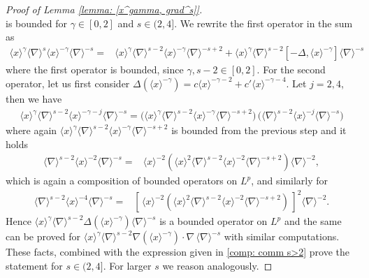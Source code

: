 \documentclass[12pt]{article}
\theoremstyle{plain}
\begin{document}
\begin{proof}[Proof of Lemma \ref{lemma: [x^gamma, grad^s]}]
\begin{equation*}
     \end{equation*}
     is bounded for $\gamma \in [0,2]$ and $s \in (2, 4]$. We rewrite the first operator in the sum as 
     \begin{align}
     \label{comp: comm s>2}
         \langle x \rangle^\gamma \langle \nabla \rangle^s \langle x \rangle^{-\gamma }\langle \nabla \rangle^{-s} =& \langle x \rangle^\gamma \langle \nabla \rangle^{s-2} \langle x \rangle^{-\gamma }\langle \nabla \rangle^{-s+2} + \langle x \rangle^\gamma \langle \nabla \rangle^{s-2} [-\Delta , \langle x \rangle^{-\gamma}]\langle \nabla \rangle^{-s}
     \end{align}
     where the first operator is bounded, since $\gamma, s-2 \in [0,2]$. For the second operator, let us first consider $ \Delta (\langle x \rangle^{-\gamma}) = c \langle x \rangle^{-\gamma-2} + c' \langle x \rangle^{-\gamma-4} $. Let $ j =2,4$, then we have
     \begin{align*}
          \langle x \rangle^\gamma \langle \nabla \rangle^{s-2} \langle x \rangle^{-\gamma-j} \langle \nabla \rangle^{-s} = \big(\langle x \rangle^\gamma \langle \nabla \rangle^{s-2} \langle x \rangle^{-\gamma}\langle \nabla \rangle^{-s +2}\big)\,\big( \langle \nabla \rangle^{s -2} \langle x \rangle^{-j}  \langle \nabla \rangle^{-s} \big)
     \end{align*}
     where again $\langle x \rangle^\gamma \langle \nabla \rangle^{s-2} \langle x \rangle^{-\gamma}\langle \nabla \rangle^{-s +2}$ is bounded from the previous step and it holds 
     \begin{align*}
         \langle \nabla \rangle^{s -2} \langle x \rangle^{-2}  \langle \nabla \rangle^{-s}  = &  \langle x \rangle^{-2}(\langle x \rangle^{2}\langle \nabla \rangle^{s -2} \langle x \rangle^{-2}  \langle \nabla \rangle^{-s+2}) \langle \nabla \rangle^{-2} ,
     \end{align*}
     which is again a composition of bounded operators on $L^p$, and similarly for 
     \begin{align*}
         \langle \nabla \rangle^{s -2} \langle x \rangle^{-4}  \langle \nabla \rangle^{-s}  = &[\, \langle x \rangle^{-2}(\langle x \rangle^{2}\langle \nabla \rangle^{s -2} \langle x \rangle^{-2}  \langle \nabla \rangle^{-s+2})\,]^2 \langle \nabla \rangle^{-2}.
     \end{align*}
          Hence $ \langle x \rangle^\gamma \langle \nabla \rangle^{s-2} \Delta (\langle x \rangle^{-\gamma})\langle \nabla \rangle^{-s}$ is a bounded operator on $L^p$ and the same can be proved for $ \langle x \rangle^\gamma \langle \nabla \rangle^{s-2} \nabla (\langle x \rangle^{-\gamma})\cdot \nabla\, \langle \nabla \rangle^{-s}$ with similar computations. These facts, combined with the expression given in \eqref{comp: comm s>2} prove the statement for $s \in (2, 4]$. For larger $s$ we reason analogously. 
    \end{proof}
\end{document}
